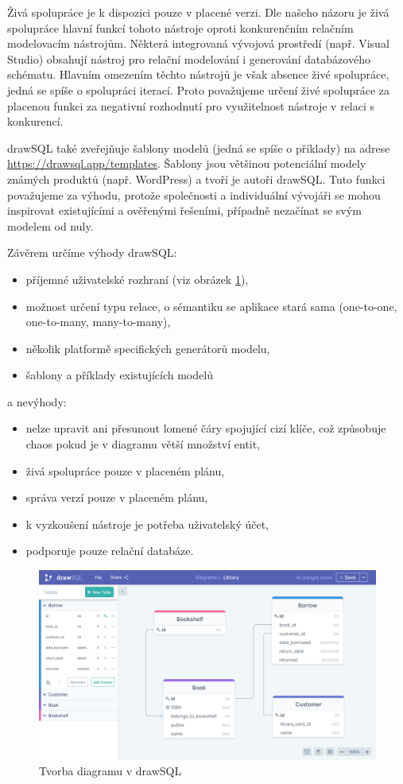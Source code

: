 Živá spolupráce je k dispozici pouze v placené verzi. Dle našeho názoru je živá
spolupráce hlavní funkcí tohoto nástroje oproti konkurenčním relačním
modelovacím nástrojům. Některá integrovaná vývojová prostředí (např. Visual
Studio) obsahují nástroj pro relační modelování i generování databázového
schématu. Hlavním omezením těchto nástrojů je však absence živé spolupráce,
jedná se spíše o spolupráci iterací. Proto považujeme určení živé spolupráce za
placenou funkci za negativní rozhodnutí pro využitelnost nástroje v relaci s
konkurencí.

drawSQL také zveřejňuje šablony modelů (jedná se spíše o příklady) na adrese
\url{https://drawsql.app/templates}. Šablony jsou většinou potenciální modely
známých produktů (např. WordPress) a tvoří je autoři drawSQL. Tuto funkci
považujeme za výhodu, protože společnosti a individuální vývojáři se mohou
inspirovat existujícími a ověřenými řešeními, případně nezačínat se svým modelem
od nuly.

Závěrem určíme výhody drawSQL:
\begin{itemize}
  \item příjemné uživatelské rozhraní (viz obrázek \ref{fig:drawsql}),
  \item možnost určení typu relace, o sémantiku se aplikace stará sama
  (one-to-one, one-to-many, many-to-many),
  \item několik platformě specifických generátorů modelu,
  \item šablony a příklady existujících modelů
\end{itemize}
a nevýhody:
\begin{itemize}
  \item nelze upravit ani přesunout lomené čáry spojující cizí klíče, což
  způsobuje chaos pokud je v diagramu větší množství entit,
  \item živá spolupráce pouze v placeném plánu,
  \item správa verzí pouze v placeném plánu,
  \item k vyzkoušení nástroje je potřeba uživatelský účet,
  \item podporuje pouze relační databáze.
\end{itemize}

\begin{figure}
  \centering
  \includegraphics[width=\textwidth]{../img/drawsql.png}
  \caption{Tvorba diagramu v drawSQL}
  \label{fig:drawsql}
\end{figure}

